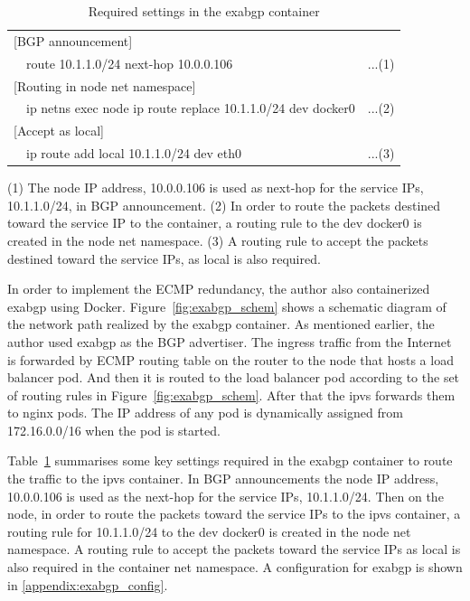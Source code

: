 \begin{table}
  \begin{center}
    \begin{tabular}{lllr}
      \hline 
      \multicolumn{4}{l}{[BGP announcement]} \\
      \hspace{15 mm} & \multicolumn{2}{l}{route 10.1.1.0/24 next-hop 10.0.0.106} & ...(1) \\
      \multicolumn{4}{l}{[Routing in node net namespace]} \\
      \hspace{15 mm} & \multicolumn{2}{l}{ip netns exec node ip route replace 10.1.1.0/24 dev docker0} & ...(2) \\
      \multicolumn{4}{l}{[Accept as local]} \\
      \hspace{15 mm} & \multicolumn{2}{l}{ip route add local 10.1.1.0/24 dev eth0} & ...(3) \\
      \hline
    \end{tabular}
    \caption{Required settings in the exabgp container}
    \label{table:exabgp_setting}
  
    \parbox[c]{0.9\columnwidth}{
      (1) The node IP address, 10.0.0.106 is used as next-hop for the service IPs, 10.1.1.0/24, in BGP announcement.
      (2) In order to route the packets destined toward the service IP to the container, a routing rule to the dev docker0 is created in the node net namespace. 
      (3) A routing rule to accept the packets destined toward the service IPs,  as local is also required.
    }
  \end{center}
\end{table}

In order to implement the ECMP redundancy, the author also containerized exabgp using Docker.
Figure~\ref{fig:exabgp_schem} shows a schematic diagram of the network path realized by the exabgp container.
As mentioned earlier, the author used exabgp as the BGP advertiser. 
The ingress traffic from the Internet is forwarded by ECMP routing table on the router to the node that hosts a load balancer pod.
And then it is routed to the load balancer pod according to the set of routing rules in Figure~\ref{fig:exabgp_schem}.
After that the ipvs forwards them to nginx pods.
The IP address of any pod is dynamically assigned from 172.16.0.0/16 when the pod is started. 

Table~\ref{table:exabgp_setting} summarises some key settings required in the exabgp container to route the traffic to the ipvs container.
In BGP announcements the node IP address, 10.0.0.106 is used as the next-hop for the service IPs, 10.1.1.0/24.
Then on the node, in order to route the packets toward the service IPs to the ipvs container, 
a routing rule for 10.1.1.0/24 to the dev docker0 is created in the node net namespace. 
A routing rule to accept the packets toward the service IPs as local is also required in the container net namespace. 
A configuration for exabgp is shown in \ref{appendix:exabgp_config}.

